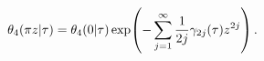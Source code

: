 \[\mathop{\theta_{4}\/}\nolimits\!\left(\pi z\middle|\tau\right)=\mathop{\theta_%
{4}\/}\nolimits\!\left(0\middle|\tau\right)\mathop{\exp\/}\nolimits\!\left(-%
\sum_{j=1}^{\infty}\frac{1}{2j}\gamma_{2j}(\tau)z^{2j}\right).\]